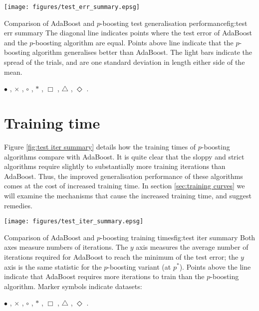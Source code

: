 \begin{linefigure}
\begin{center}
\texttt{[image: figures/test\_err\_summary.epsg]}
\end{center}
\begin{capt}{Comparison of AdaBoost and $p$-boosting test generalisation
performance}{fig:test err summary}
The diagonal line indicates points where the test error of AdaBoost
and the $p$-boosting algorithm are equal.  Points above line indicate
that the $p$-boosting algorithm generalises better than AdaBoost.  The
light bars indicate the spread of the trials, and are one standard
deviation in length either side of the mean.

 $\bullet$ , $\times$ , $\circ$
, $\ast$ , $\Box$ , $\bigtriangleup$
, $\Diamond$ .
\end{capt}
\end{linefigure}


\section{Training time}

Figure \ref{fig:test iter summary} details how the training times of
$p$-boosting algorithms compare with AdaBoost.  It is quite clear that
the sloppy and strict algorithms require slightly to substantially
more training iterations than AdaBoost.  Thus, the improved
generalisation performance of these algorithms comes at the cost of
increased training time.  In section \ref{sec:training curves} we will
examine the mechanisms that cause the increased training time, and
suggest remedies.

\begin{linefigure}
\begin{center}
\texttt{[image: figures/test\_iter\_summary.epsg]}
\end{center}
\begin{capt}{Comparison of AdaBoost and $p$-boosting training
times}{fig:test iter summary} 
Both axes measure numbers of iterations.  The $y$ axis measures the
average number of iterations required for AdaBoost to reach the
minimum of the test error; the $y$ axis is the same statistic for the
$p$-boosting variant (at $p^{\ast}$).  Points above the line indicate
that AdaBoost requires more iterations to train than the $p$-boosting
algorithm.  Marker symbols indicate datasets:

 $\bullet$ , $\times$ , $\circ$
, $\ast$ , $\Box$ , $\bigtriangleup$
, $\Diamond$ .
\end{capt}
\end{linefigure}


